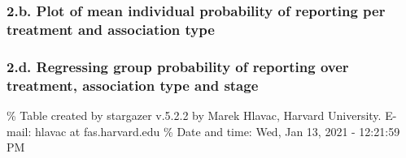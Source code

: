\documentclass[
]{article}
\begin{document}
\hypertarget{b.-plot-of-mean-individual-probability-of-reporting-per-treatment-and-association-type}{%
\subsubsection{2.b. Plot of mean individual probability of reporting per
treatment and association
type}\label{b.-plot-of-mean-individual-probability-of-reporting-per-treatment-and-association-type}}

\hypertarget{d.-regressing-group-probability-of-reporting-over-treatment-association-type-and-stage}{%
\subsubsection{2.d. Regressing group probability of reporting over
treatment, association type and
stage}\label{d.-regressing-group-probability-of-reporting-over-treatment-association-type-and-stage}}

\% Table created by stargazer v.5.2.2 by Marek Hlavac, Harvard
University. E-mail: hlavac at fas.harvard.edu \% Date and time: Wed, Jan
13, 2021 - 12:21:59 PM
\end{document}
